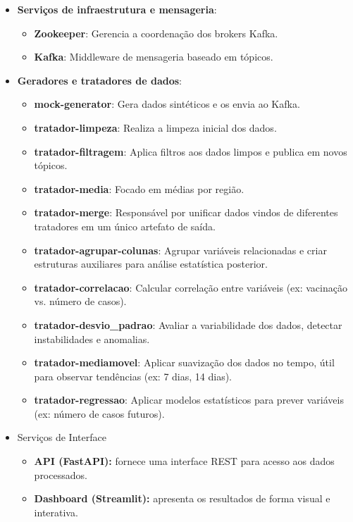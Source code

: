\documentclass[a4paper,12pt]{article}
\begin{document}
\begin{itemize}
  \item \textbf{Serviços de infraestrutura e mensageria}: 
          \begin{itemize}
          \item \textbf{Zookeeper}: Gerencia a coordenação dos brokers Kafka.
          \item \textbf{Kafka}: Middleware de mensageria baseado em tópicos.
          \end{itemize}
  \item \textbf{Geradores e tratadores de dados}:
  \begin{itemize}
  \item \textbf{mock-generator}: Gera dados sintéticos e os envia ao Kafka.
  \item \textbf{tratador-limpeza}: Realiza a limpeza inicial dos dados.
  \item \textbf{tratador-filtragem}: Aplica filtros aos dados limpos e publica em novos tópicos.
  \item \textbf{tratador-media}: Focado em médias por região.
  \item \textbf{tratador-merge}: Responsável por unificar dados vindos de diferentes tratadores em um único artefato de saída.
    \item \textbf{tratador-agrupar-colunas}: Agrupar variáveis relacionadas e criar estruturas auxiliares para análise estatística posterior.
    \item \textbf{tratador-correlacao}: Calcular correlação entre variáveis (ex: vacinação vs. número de casos).
    \item \textbf{tratador-desvio_padrao}: Avaliar a variabilidade dos dados, detectar instabilidades e anomalias.
    \item \textbf{tratador-mediamovel}: Aplicar suavização dos dados no tempo, útil para observar tendências (ex: 7 dias, 14 dias).
    \item \textbf{tratador-regressao}: Aplicar modelos estatísticos para prever variáveis (ex: número de casos futuros).
\end{itemize}
    \item Serviços de Interface 

    \begin{itemize}
  \item \textbf{API (FastAPI):} fornece uma interface REST para acesso aos dados processados.
  \item \textbf{Dashboard (Streamlit):} apresenta os resultados de forma visual e interativa.
\end{itemize}
\end{itemize}
\end{document}
